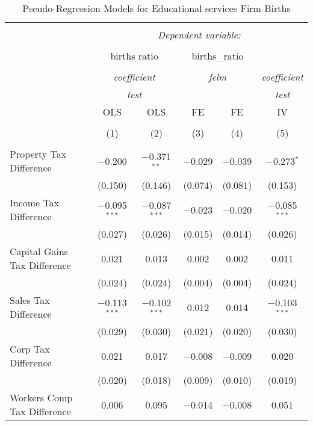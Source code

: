 
\begin{table}[!htbp] \centering 
  \caption{Pseudo-Regression Models for  Educational services Firm Births} 
  \label{} 
\begin{tabular}{@{\extracolsep{5pt}}lccccc} 
\\[-1.8ex]\hline 
\hline \\[-1.8ex] 
 & \multicolumn{5}{c}{\textit{Dependent variable:}} \\ 
\cline{2-6} 
\\[-1.8ex] & \multicolumn{2}{c}{births ratio} & \multicolumn{2}{c}{births\_ratio} &   \\ 
\\[-1.8ex] & \multicolumn{2}{c}{\textit{coefficient}} & \multicolumn{2}{c}{\textit{felm}} & \textit{coefficient} \\ 
 & \multicolumn{2}{c}{\textit{test}} & \multicolumn{2}{c}{\textit{}} & \textit{test} \\ 
 & OLS & OLS & FE & FE & IV \\ 
\\[-1.8ex] & (1) & (2) & (3) & (4) & (5)\\ 
\hline \\[-1.8ex] 
 Property Tax Difference & $-$0.200 & $-$0.371$^{**}$ & $-$0.029 & $-$0.039 & $-$0.273$^{*}$ \\ 
  & (0.150) & (0.146) & (0.074) & (0.081) & (0.153) \\ 
  Income Tax Difference & $-$0.095$^{***}$ & $-$0.087$^{***}$ & $-$0.023 & $-$0.020 & $-$0.085$^{***}$ \\ 
  & (0.027) & (0.026) & (0.015) & (0.014) & (0.026) \\ 
  Capital Gains Tax Difference & 0.021 & 0.013 & 0.002 & 0.002 & 0.011 \\ 
  & (0.024) & (0.024) & (0.004) & (0.004) & (0.024) \\ 
  Sales Tax Difference & $-$0.113$^{***}$ & $-$0.102$^{***}$ & 0.012 & 0.014 & $-$0.103$^{***}$ \\ 
  & (0.029) & (0.030) & (0.021) & (0.020) & (0.030) \\ 
  Corp Tax Difference & 0.021 & 0.017 & $-$0.008 & $-$0.009 & 0.020 \\ 
  & (0.020) & (0.018) & (0.009) & (0.010) & (0.019) \\ 
  Workers Comp Tax Difference & 0.006 & 0.095 & $-$0.014 & $-$0.008 & 0.051 \\ 

\end{tabular}
\end{table}
